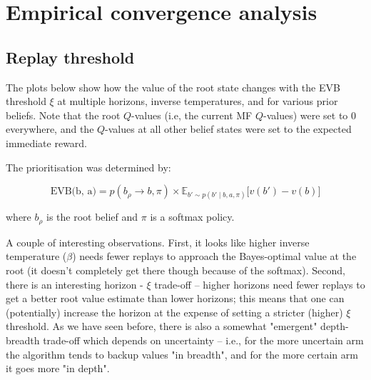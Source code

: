 \documentclass{article}
\begin{document}
\section*{Empirical convergence analysis}

\subsection*{Replay threshold}
The plots below show how the value of the root state changes with the EVB threshold $\xi$ at multiple horizons, 
inverse temperatures, and for various prior beliefs. Note that the root $Q$-values (i.e, the current MF $Q$-values) were set to $0$ 
everywhere, and the $Q$-values at all other belief states were set to the expected immediate reward.

\bigbreak

The prioritisation was determined by:

\begin{equation*}
    \text{EVB(b, a)} = p(b_{\rho}\rightarrow b, \pi) \times \mathbb{E}_{b' \sim p(b' \mid b, a, \pi)}\big[v(b')-v(b)\big]
\end{equation*}

where $b_{\rho}$ is the root belief and $\pi$ is a softmax policy.

\bigbreak

A couple of interesting observations. First, it looks like higher inverse temperature ($\beta$) needs 
fewer replays to approach the Bayes-optimal value at the root (it doesn't completely get there though 
because of the softmax). Second, there is an interesting horizon - $\xi$ trade-off -- higher horizons 
need fewer replays to get a better root value estimate than lower horizons; this means that one can 
(potentially) increase the horizon at the expense of setting a stricter (higher) $\xi$ threshold. As 
we have seen before, there is also a somewhat "emergent" depth-breadth trade-off which depends on 
uncertainty -- i.e., for the more uncertain arm the algorithm tends to backup values "in breadth", and 
for the more certain arm it goes more "in depth".  

\newpage
\end{document}
